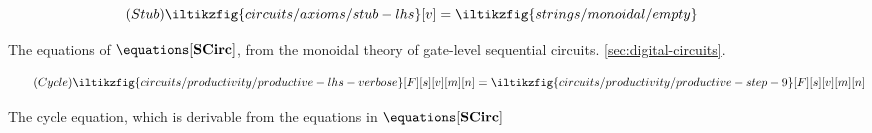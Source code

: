 \begin{figure}[p]
    \begin{minipage}[b]{0.22\textwidth}
        \begin{equation}
            \tag{\(\mathsf{Stub}\)}
            \iltikzfig{circuits/axioms/stub-lhs}[v]
            =
            \iltikzfig{strings/monoidal/empty}
            \label{eq:stub}
        \end{equation}
    \end{minipage}
    \begin{minipage}[b]{0.3\textwidth}
        \forkgateeqn
    \end{minipage}
    \begin{minipage}[b]{0.25\textwidth}
        \stubgateeqn
    \end{minipage}
    \begin{minipage}[b]{0.25\textwidth}
        \stubdelayeqn
    \end{minipage}
    \begin{minipage}[b]{0.22\textwidth}
        \forkjoininverseeqn
    \end{minipage}
    \begin{minipage}[b]{0.4\textwidth}
        \streamingeqn
    \end{minipage}
    \begin{minipage}[b]{0.25\textwidth}
        \disconnecteqn
    \end{minipage}
    \begin{minipage}[b]{0.25\textwidth}
        \forkdelayeqn
    \end{minipage}
    \begin{minipage}[b]{0.25\textwidth}
        \joindelayeqn
    \end{minipage}
    \begin{minipage}[b]{0.3\textwidth}
        \instantfeedbackeqn
    \end{minipage}
    \begin{minipage}[b]{0.35\textwidth}
        \delaydiscardeqn
    \end{minipage}
    \caption{
        The equations of \(\equations[\mathbf{SCirc}]\), from the monoidal
        theory of gate-level sequential circuits.
        \cref{sec:digital-circuits}.
    }
    \label{fig:circuit-equations}
\end{figure}
\begin{figure*}
    \centering
    \begin{equation*}
        \tag{\(\mathsf{Cycle}\)}
        \iltikzfig{circuits/productivity/productive-lhs-verbose}[F][s][v][m][n]
        =
        \iltikzfig{circuits/productivity/productive-step-9}[F][s][v][m][n]
        \label{eq:cycle}
    \end{equation*}
    \caption{
        The cycle equation, which is derivable from the equations in
        \(\equations[\mathbf{SCirc}]\)
    }
    \label{fig:cycle}
\end{figure*}